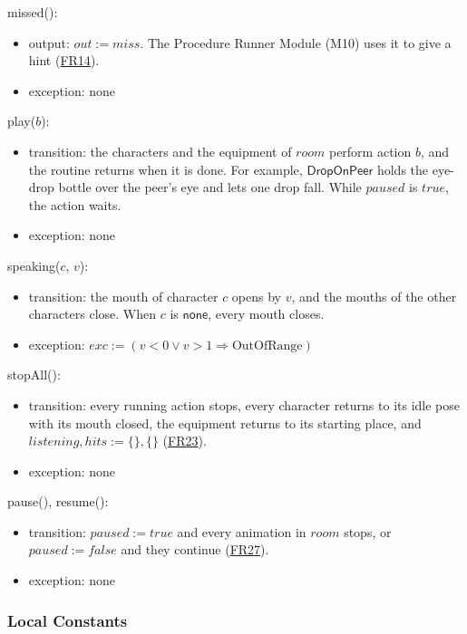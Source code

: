 \documentclass[10pt, titlepage]{article}
\newcommand{\srsurl}{https://team-hindsight.github.io/ophthamology-game/SRS/SRS.pdf}
\newcommand{\srsitemref}[2]{\href{\srsurl\#nameddest=#1}{#2}}
\newcommand{\T}[1]{\mathit{#1}}          %
\newcommand{\V}[1]{\mathsf{#1}}          %
\newcommand{\out}{\mathit{out}}
\newcommand{\exc}{\mathit{exc}}
\newcommand{\true}{\mathit{true}}
\newcommand{\false}{\mathit{false}}
\begin{document}
\noindent missed():
\begin{itemize}
\item output: $\out := \T{miss}$. The Procedure Runner Module (M10) uses it to
  give a hint (\srsitemref{FR_HintOnMiss}{FR14}).
\item exception: none
\end{itemize}

\noindent play($b$):
\begin{itemize}
\item transition: the characters and the equipment of $\T{room}$ perform
  action $b$, and the routine returns when it is done. For example,
  $\V{DropOnPeer}$ holds the eye-drop bottle over the peer's eye and lets one
  drop fall. While $\T{paused}$ is $\true$, the action waits.
\item exception: none
\end{itemize}

\noindent speaking($c$, $v$):
\begin{itemize}
\item transition: the mouth of character $c$ opens by $v$, and the mouths of
  the other characters close. When $c$ is $\V{none}$, every mouth closes.
\item exception: $\exc := (v < 0 \vee v > 1 \Rightarrow \text{OutOfRange})$
\end{itemize}

\noindent stopAll():
\begin{itemize}
\item transition: every running action stops, every character returns to its
  idle pose with its mouth closed, the equipment returns to its starting
  place, and $\T{listening}, \T{hits} := \{\}, \{\}$
  (\srsitemref{FR_StopOnExit}{FR23}).
\item exception: none
\end{itemize}

\noindent pause(), resume():
\begin{itemize}
\item transition: $\T{paused} := \true$ and every animation in $\T{room}$
  stops, or $\T{paused} := \false$ and they continue
  (\srsitemref{FR_Suspend}{FR27}).
\item exception: none
\end{itemize}

\subsubsection{Local Constants}
\end{document}
